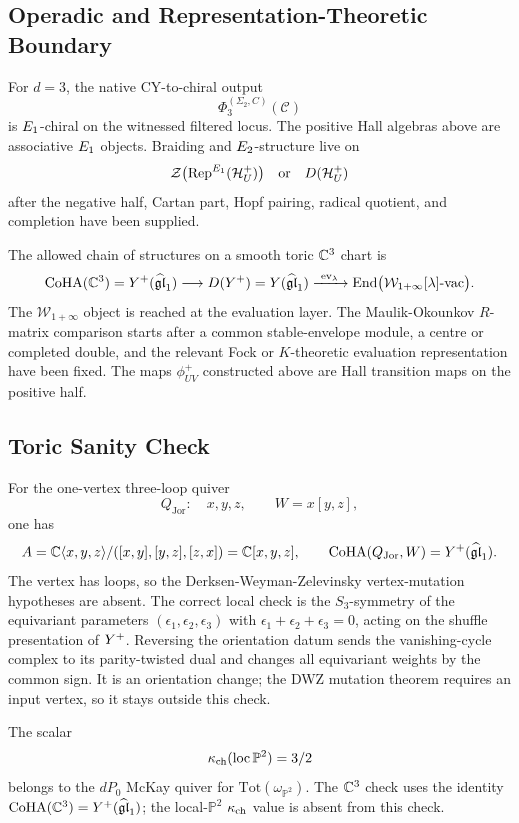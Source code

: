 \subsection*{Operadic and Representation-Theoretic Boundary}

For \(d=3\), the native CY-to-chiral output
\[
  \Phi_3^{(\Sigma_2,C)}(\mathcal C)
\]
is \(E_1\)-chiral on the witnessed filtered locus. The positive Hall
algebras above are associative \(E_1\) objects. Braiding and
\(E_2\)-structure live on
\[
  \mathcal Z\bigl(\mathrm{Rep}^{E_1}(\mathcal H_U^+)\bigr)
  \quad\text{or}\quad
  D(\mathcal H_U^+)
\]
after the negative half, Cartan part, Hopf pairing, radical quotient,
and completion have been supplied.

The allowed chain of structures on a smooth toric \(\mathbb C^3\) chart is
\[
  \mathrm{CoHA}(\mathbb C^3)
  =
  Y^{+}(\widehat{\mathfrak{gl}}_1)
  \longrightarrow
  D(Y^{+})
  =
  Y(\widehat{\mathfrak{gl}}_1)
  \xrightarrow{\ \mathrm{ev}_{\lambda}\ }
  \mathrm{End}\bigl(\mathcal W_{1+\infty}[\lambda]\text{-}\mathrm{vac}\bigr).
\]
The \(\mathcal W_{1+\infty}\) object is reached at the evaluation
layer. The Maulik-Okounkov \(R\)-matrix comparison starts after a common
stable-envelope module, a centre or completed double, and the relevant
Fock or \(K\)-theoretic evaluation representation have been fixed. The
maps \(\phi^+_{UV}\) constructed above are Hall transition maps on the
positive half.

\subsection*{Toric Sanity Check}

For the one-vertex three-loop quiver
\[
  Q_{\mathrm{Jor}}:\quad x,y,z,
  \qquad
  W=x[y,z],
\]
one has
\[
  A=\mathbb C\langle x,y,z\rangle/
  ([x,y],[y,z],[z,x])=\mathbb C[x,y,z],
  \qquad
  \mathrm{CoHA}(Q_{\mathrm{Jor}},W)=Y^{+}(\widehat{\mathfrak{gl}}_1).
\]
The vertex has loops, so the Derksen-Weyman-Zelevinsky vertex-mutation
hypotheses are absent. The correct local check is the \(S_3\)-symmetry
of the equivariant parameters
\((\epsilon_1,\epsilon_2,\epsilon_3)\) with
\(\epsilon_1+\epsilon_2+\epsilon_3=0\), acting on the shuffle
presentation of \(Y^{+}\). Reversing the orientation datum sends the
vanishing-cycle complex to its parity-twisted dual and changes all
equivariant weights by the common sign. It is an orientation change; the
DWZ mutation theorem requires an input vertex, so it stays outside this
check.

The scalar
\[
  \kappa_{\mathrm{ch}}(\mathrm{loc}\,\mathbb P^2)=3/2
\]
belongs to the \(dP_0\) McKay quiver for
\(\mathrm{Tot}(\omega_{\mathbb P^2})\). The \(\mathbb C^3\) check uses the
identity \(\mathrm{CoHA}(\mathbb C^3)=Y^{+}(\widehat{\mathfrak{gl}}_1)\); the
local-\(\mathbb P^2\) \(\kappa_{\mathrm{ch}}\) value is absent from this check.

